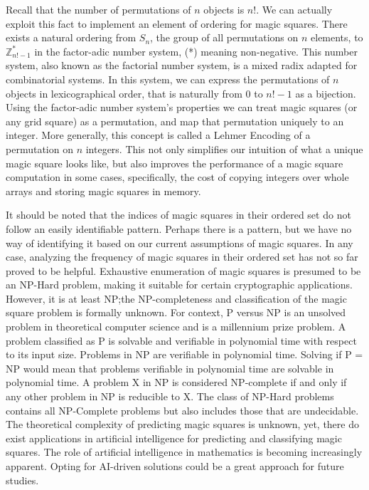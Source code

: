 \documentclass{rhumj_new}
\begin{document}
Recall that the number of permutations of $n$ objects is $n$!. We can actually exploit this
fact to implement an element of ordering for magic squares. There exists a natural ordering from
$S_n$, the group of all permutations on $n$ elements, to $\mathbb{Z}^{*}_{n!-1}$  in the
factor-adic number system, (*) meaning non-negative. This number system, also known as the
factorial number system, is a mixed radix adapted for combinatorial systems. In this system, we can
express the permutations of $n$ objects in lexicographical order, that is naturally from $0$ to
$n!-1$ as a bijection. Using the factor-adic number system's properties we can treat magic squares
(or any grid square) as a permutation, and map that permutation uniquely to an integer. More
generally, this concept is called a Lehmer Encoding of a permutation on $n$ integers\cite{Lehmer}.
This
not only simplifies our intuition of what a unique magic square looks like, but also improves the
performance of a magic square computation in some cases, specifically, the cost of copying integers
over whole arrays and storing magic squares in memory.

It should be noted that the indices of magic squares in their ordered set do not follow an easily
identifiable pattern. Perhaps there is a pattern, but we have no way of identifying it based on our
current assumptions of magic squares. In any case, analyzing the frequency of magic squares in
their ordered set has not so far proved to be helpful. Exhaustive enumeration of magic squares is
presumed to be an NP-Hard problem, making it suitable for certain cryptographic applications.
However, it is at least NP;\@ the NP-completeness and classification of the magic square problem is
formally unknown. For context, P versus NP is an unsolved problem in theoretical computer science
and is a millennium prize problem. A problem classified as P is solvable and verifiable in
polynomial time with respect to its input size. Problems in NP are verifiable in polynomial time.
Solving if P = NP would mean that problems verifiable in polynomial time are solvable in polynomial
time. A problem X in NP is considered NP-complete if and only if any other problem in NP is
reducible to X. The class of NP-Hard problems contains all NP-Complete problems but also includes
those that are undecidable. The theoretical complexity of predicting magic squares is unknown, yet,
there do exist applications in artificial intelligence for predicting and classifying magic
squares\cite{Weed}. The role of artificial intelligence in mathematics is becoming increasingly
apparent. Opting for AI-driven solutions could be a great approach for future studies.
\end{document}

